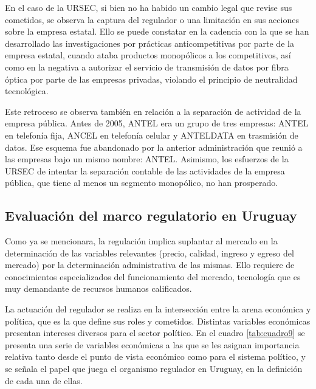 \documentclass[
  12pt,
  spanish,
]{book}
\begin{document}
En el caso de la URSEC, si bien no ha habido un cambio legal que revise sus cometidos, se observa la captura del regulador o una limitación en sus acciones sobre la empresa estatal. Ello se puede constatar en la cadencia con la que se han desarrollado las investigaciones por prácticas anticompetitivas por parte de la empresa estatal, cuando ataba productos monopólicos a los competitivos, así como en la negativa a autorizar el servicio de transmisión de datos por fibra óptica por parte de las empresas privadas, violando el principio de neutralidad tecnológica.

Este retroceso se observa también en relación a la separación de actividad de la empresa pública. Antes de 2005, ANTEL era un grupo de tres empresas: ANTEL en telefonía fija, ANCEL en telefonía celular y ANTELDATA en trasmisión de datos. Ese esquema fue abandonado por la anterior administración que reunió a las empresas bajo un mismo nombre: ANTEL. Asimismo, los esfuerzos de la URSEC de intentar la separación contable de las actividades de la empresa pública, que tiene al menos un segmento monopólico, no han prosperado.

\hypertarget{evaluaciuxf3n-del-marco-regulatorio-en-uruguay}{%
\subsection{Evaluación del marco regulatorio en Uruguay}\label{evaluaciuxf3n-del-marco-regulatorio-en-uruguay}}

Como ya se mencionara, la regulación implica suplantar al mercado en la determinación de las variables relevantes (precio, calidad, ingreso y egreso del mercado) por la determinación administrativa de las mismas. Ello requiere de conocimientos especializados del funcionamiento del mercado, tecnología que es muy demandante de recursos humanos calificados.

La actuación del regulador se realiza en la intersección entre la arena económica y política, que es la que define sus roles y cometidos. Distintas variables económicas presentan intereses diversos para el sector político. En el cuadro \ref{tab:cuadro9} se presenta una serie de variables económicas a las que se les asignan importancia relativa tanto desde el punto de vista económico como para el sistema político, y se señala el papel que juega el organismo regulador en Uruguay, en la definición de cada una de ellas.
\end{document}
